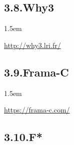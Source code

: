 \documentclass[12pt,twoside]{article}
\begin{document}
\subsection{3.8.\hspace*{0.5em}Why3}%

\begin{mddefinitions}%


\begin{mdbmarginx}{}{}{}{1.5em}%
\begin{mddefdata}%
\href{http://why3.lri.fr/}{{\ttfamily http://\hspace{0pt}why3.\hspace{0pt}lri.\hspace{0pt}fr/\hspace{0pt}}}%
\end{mddefdata}%
\end{mdbmarginx}%
\end{mddefinitions}%

\subsection{3.9.\hspace*{0.5em}Frama-C}%

\begin{mddefinitions}%


\begin{mdbmarginx}{}{}{}{1.5em}%
\begin{mddefdata}%
\href{https://frama-c.com/}{{\ttfamily https://\hspace{0pt}frama-\hspace{0pt}c.\hspace{0pt}com/\hspace{0pt}}}%
\end{mddefdata}%
\end{mdbmarginx}%
\end{mddefinitions}%

\subsection{3.10.\hspace*{0.5em}F*}%
\end{document}
